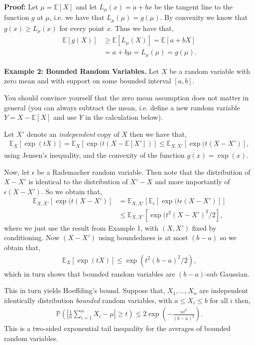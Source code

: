 \documentclass[twoside,12pt]{article}
\begin{document}
{\bf Proof: } Let $\mu = \mathbb{E}[X]$ and let $L_\mu(x) = a + bx$ be the tangent line to the function $g$ at $\mu$, i.e. we have that $L_{\mu}(\mu) = g(\mu)$. By convexity we know that $g(x) \geq L_{\mu}(x)$ for every point $x$. Thus we have that,
\begin{align*}
\mathbb{E}[g(X)] &\geq \mathbb{E}[L_{\mu}(X)] = \mathbb{E}[a + bX] \\
&= a + b \mu = L_{\mu}(\mu) = g(\mu).
\end{align*}

{\bf Example 2: Bounded Random Variables. }  Let $X$ be a random variable with zero mean and with support on some bounded interval $[a,b]$. 

You should convince yourself that the zero mean assumption does not matter in general (you can always subtract the mean, i.e. define a new random variable $Y = X - \mathbb{E}[X]$ and use $Y$ in the calculation below).

Let $X'$ denote an \emph{independent} copy of $X$ then we have that,
\begin{align*}
\mathbb{E}_X[\exp(tX)] = \mathbb{E}_X[\exp(t(X - \mathbb{E}[X'])] \leq   \mathbb{E}_{X,X'}[\exp(t(X - X')], 
\end{align*}
using Jensen's inequality, and the convexity of the function $g(x) = \exp(x)$.

Now, let $\epsilon$ be a Rademacher random variable. Then note that the distribution of $X - X'$ is identical to the distribution of $X' - X$ and more importantly of $\epsilon(X - X')$. So we obtain that,
\begin{align*}
\mathbb{E}_{X,X'}[\exp(t(X - X')] &= \mathbb{E}_{X,X'}[\mathbb{E}_{\epsilon} [\exp(t\epsilon(X - X')]] \\
&\leq  \mathbb{E}_{X,X'} [\exp(t^2 (X - X')^2/2],
\end{align*}
where we just use the result from Example 1, with $(X,X')$ fixed by conditioning. Now $(X - X')$ using boundedness is at most $(b - a)$ so we obtain that,
\begin{align*}
\mathbb{E}_X[\exp(tX)] \leq \exp(t^2 (b-a)^2/2),
\end{align*}
which in turn shows that bounded random variables are $(b-a)$-sub Gaussian.

This in turn yields Hoeffding's bound.
Suppose that, $X_1,\ldots, X_n$ are independent identically distribution \emph{bounded} random variables, with $a \leq X_i \leq b$ for all $i$ then,
\begin{align*}
\mathbb{P}\left( \left| \frac{1}{n} \sum_{i=1}^n X_i - \mu \right| \geq t \right) \leq 2 \exp \left( - \frac{nt^2}{(b-a)^2} \right).
\end{align*}
This is a two-sided exponential tail inequality for the averages of bounded random variables. 
\end{document}
